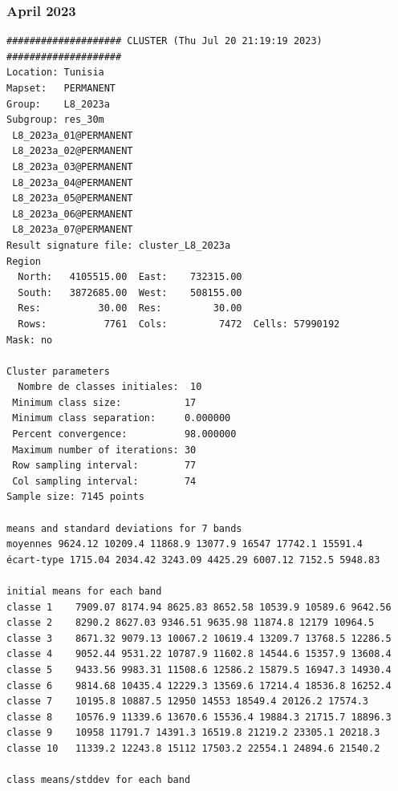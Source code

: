 \documentclass[environments,article,submit,pdftex,moreauthors]{Definitions/mdpi}
\begin{document}
\subsubsection[\appendixname~\thesubsubsection]{April 2023}
\begin{scriptsize}
\begin{verbatim}
#################### CLUSTER (Thu Jul 20 21:19:19 2023) ####################
Location: Tunisia
Mapset:   PERMANENT
Group:    L8_2023a
Subgroup: res_30m
 L8_2023a_01@PERMANENT
 L8_2023a_02@PERMANENT
 L8_2023a_03@PERMANENT
 L8_2023a_04@PERMANENT
 L8_2023a_05@PERMANENT
 L8_2023a_06@PERMANENT
 L8_2023a_07@PERMANENT
Result signature file: cluster_L8_2023a
Region
  North:   4105515.00  East:    732315.00
  South:   3872685.00  West:    508155.00
  Res:          30.00  Res:         30.00
  Rows:          7761  Cols:         7472  Cells: 57990192
Mask: no

Cluster parameters
  Nombre de classes initiales: 	10
 Minimum class size:           17
 Minimum class separation:     0.000000
 Percent convergence:          98.000000
 Maximum number of iterations: 30
 Row sampling interval:        77
 Col sampling interval:        74
Sample size: 7145 points

means and standard deviations for 7 bands
moyennes 9624.12 10209.4 11868.9 13077.9 16547 17742.1 15591.4
écart-type 1715.04 2034.42 3243.09 4425.29 6007.12 7152.5 5948.83

initial means for each band
classe 1    7909.07 8174.94 8625.83 8652.58 10539.9 10589.6 9642.56
classe 2    8290.2 8627.03 9346.51 9635.98 11874.8 12179 10964.5
classe 3    8671.32 9079.13 10067.2 10619.4 13209.7 13768.5 12286.5
classe 4    9052.44 9531.22 10787.9 11602.8 14544.6 15357.9 13608.4
classe 5    9433.56 9983.31 11508.6 12586.2 15879.5 16947.3 14930.4
classe 6    9814.68 10435.4 12229.3 13569.6 17214.4 18536.8 16252.4
classe 7    10195.8 10887.5 12950 14553 18549.4 20126.2 17574.3
classe 8    10576.9 11339.6 13670.6 15536.4 19884.3 21715.7 18896.3
classe 9    10958 11791.7 14391.3 16519.8 21219.2 23305.1 20218.3
classe 10   11339.2 12243.8 15112 17503.2 22554.1 24894.6 21540.2

class means/stddev for each band


\end{verbatim}
\end{scriptsize}
\end{document}
